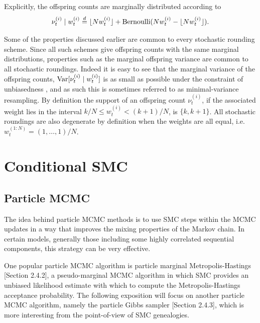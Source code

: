 Explicitly, the offspring counts are marginally distributed according to 
\begin{equation}
\nu_t^{(i)} \mid w_t^{(i)}
\overset{d}{=} \lfloor N w_t^{(i)} \rfloor + \operatorname{Bernoulli}( Nw_t^{(i)} - \lfloor N w_t^{(i)} \rfloor ) .
\end{equation}

Some of the properties discussed earlier are common to every stochastic rounding scheme. 
Since all such schemes give offspring counts with the same marginal distributions, properties such as the marginal offspring variance are common to all stochastic roundings. Indeed it is easy to see that the marginal variance of the offspring counts, $\operatorname{Var}[ \nu_t^{(i)} \mid w_t^{(i)} ]$ is as small as possible under the constraint of unbiasedness , and as such this is sometimes referred to as minimal-variance resampling.
By definition the support of an offspring count $\nu_t^{(i)}$, if the associated weight lies in the interval $k/N \leq w_t^{(i)} < (k+1)/N$, is $\{ k, k+1\}$. 
All stochastic roundings are also degenerate by definition when the weights are all equal, i.e.\ $w_t^{(1:N)} = (1,\dots, 1)/N$.





\section{Conditional SMC \seb{$\sim$} }

\subsection{Particle MCMC \seb{$\checkmark$} }

The idea behind particle MCMC methods is to use SMC steps within the MCMC updates in a way that improves the mixing properties of the Markov chain.
In certain models, generally those including some highly correlated sequential components, this strategy can be very effective.

One popular particle MCMC algorithm is particle marginal Metropolis-Hastings \parencite{andrieu2010}[Section 2.4.2], a pseudo-marginal MCMC algorithm in which SMC provides an unbiased likelihood estimate with which to compute the Metropolis-Hastings acceptance probability.
The following exposition will focus on another particle MCMC algorithm, namely the particle Gibbs sampler \parencite{andrieu2010}[Section 2.4.3], which is more interesting from the point-of-view of SMC genealogies.

